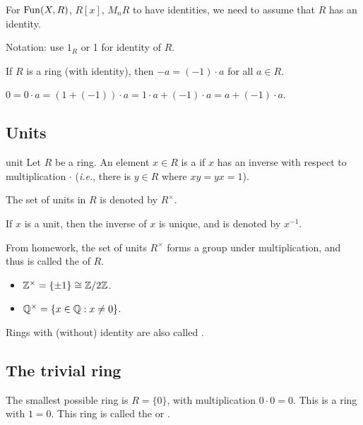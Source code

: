 \documentclass[12pt,letterpaper]{report}
\begin{document}
For $\operatorname{Fun}(X, R)$, $R[x]$, $M_nR$ to have identities, we need to assume that $R$ has an identity.

Notation: use $1_R$ or 1 for identity of $R$.

\begin{prop}{}{}
  If $R$ is a ring (with identity), then $-a = (-1) \cdot a$ for all $a \in R$.
\end{prop}

\begin{thmproof}
  $0 = 0 \cdot a = (1 + (-1)) \cdot a = 1 \cdot a + (-1) \cdot a = a + (-1) \cdot a$.
\end{thmproof}

\pagebreak
\subsection{Units}

\begin{defn}{unit}{}
  Let $R$ be a ring.
  An element $x \in R$ is a  if $x$ has an inverse with respect to multiplication
  $\cdot$ (\emph{i.e.}, there is $y \in R$ where $xy = yx = 1$).

  The set of units in $R$ is denoted by $R^\times$.
\end{defn}

If $x$ is a unit, then the inverse of $x$ is unique, and is denoted by $x^{-1}$.

From homework, the set of units $R^\times$ forms a group under multiplication, and thus is called
the  of $R$.

\begin{ex}
  \begin{itemize}
    \item $\mathbb{Z}^\times = \{\pm 1\} \cong \mathbb{Z}/{2}\mathbb{Z}$.
    \item $\mathbb{Q}^\times = \{x \in \mathbb{Q} : x \neq 0\}$.
  \end{itemize}
\end{ex}

Rings with (without) identity are also called .

\pagebreak
\subsection{The trivial ring}

The smallest possible ring is $R = \{0\}$, with multiplication $0 \cdot 0 = 0$.
This is a ring with $1 = 0$.
This ring is called the  or .
\end{document}
